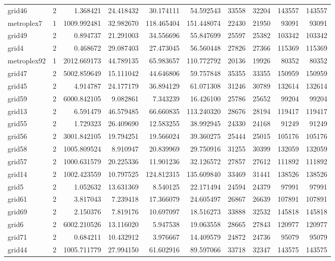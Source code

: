 \begin{longtable}{|l|r|r|r|r|r|r|r|r|r|}
grid46 & 2 & 1.368421 & 24.418432 & 30.174111 & 54.592543 & 33558 & 32204 & 143557 & 143557 \\
metroplex7 & 1 & 1009.992481 & 32.982670 & 118.465404 & 151.448074 & 22430 & 21950 & 93091 & 93091 \\
grid49 & 2 & 0.894737 & 21.291003 & 34.556696 & 55.847699 & 25597 & 25382 & 103342 & 103342 \\
grid4 & 2 & 0.468672 & 29.087403 & 27.473045 & 56.560448 & 27826 & 27366 & 115369 & 115369 \\
metroplex92 & 1 & 2012.669173 & 44.789135 & 65.983657 & 110.772792 & 20136 & 19926 & 80352 & 80352 \\
grid47 & 2 & 5002.859649 & 15.111042 & 44.646806 & 59.757848 & 35355 & 33355 & 150959 & 150959 \\
grid45 & 2 & 4.914787 & 24.177179 & 36.894129 & 61.071308 & 31246 & 30789 & 132614 & 132614 \\
grid59 & 2 & 6000.842105 & 9.082861 & 7.343239 & 16.426100 & 25786 & 25652 & 99204 & 99204 \\
grid13 & 2 & 6.591479 & 46.579485 & 66.660835 & 113.240320 & 28676 & 28194 & 119417 & 119417 \\
grid55 & 2 & 1.729323 & 26.409690 & 12.583255 & 38.992945 & 24330 & 24168 & 91249 & 91249 \\
grid56 & 2 & 3001.842105 & 19.794251 & 19.566024 & 39.360275 & 25444 & 25015 & 105176 & 105176 \\
grid58 & 2 & 1005.809524 & 8.910947 & 20.839969 & 29.750916 & 31255 & 30399 & 132059 & 132059 \\
grid57 & 2 & 1000.631579 & 20.225336 & 11.901236 & 32.126572 & 27857 & 27612 & 111892 & 111892 \\
grid14 & 2 & 1002.423559 & 10.797525 & 124.812315 & 135.609840 & 33469 & 31441 & 138526 & 138526 \\
grid5 & 2 & 1.052632 & 13.631369 & 8.540125 & 22.171494 & 24594 & 24379 & 97991 & 97991 \\
grid61 & 2 & 3.817043 & 7.239418 & 17.366079 & 24.605497 & 26867 & 26639 & 107891 & 107891 \\
grid69 & 2 & 2.150376 & 7.819176 & 10.697097 & 18.516273 & 33888 & 32532 & 145818 & 145818 \\
grid6 & 2 & 6002.210526 & 13.116020 & 5.947538 & 19.063558 & 28665 & 27843 & 120977 & 120977 \\
grid71 & 2 & 0.684211 & 10.432912 & 3.976667 & 14.409579 & 24872 & 24736 & 95079 & 95079 \\
grid44 & 2 & 1005.711779 & 27.994150 & 61.602916 & 89.597066 & 33718 & 32347 & 143575 & 143575 \\

\end{longtable}
